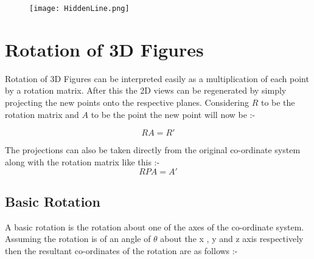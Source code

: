 \documentclass[12pt,a4paper]{article}
\begin{document}



\begin{figure}
\centering
\texttt{[image: HiddenLine.png]}
\end{figure}

\section{Rotation of 3D Figures}

Rotation of 3D Figures can be interpreted easily as a multiplication of each point by a rotation matrix. After this the 2D views can be regenerated by simply projecting the new points onto the respective planes. Considering \boldmath$R$ to be the rotation matrix and \boldmath$A$ to be the point the new point will now be :- 

\begin{equation}
R  A = R'
\end{equation}

The projections can also be taken directly from the original co-ordinate system along with the rotation matrix like this :-
\begin{equation}
R P A = A'
\end{equation}

\subsection{Basic Rotation}

A basic rotation is the rotation about one of the axes of the co-ordinate system. Assuming the rotation is of an angle of $ \theta $ about the x , y and z axis respectively then the resultant co-ordinates of the rotation are as follows :-
\end{document}
